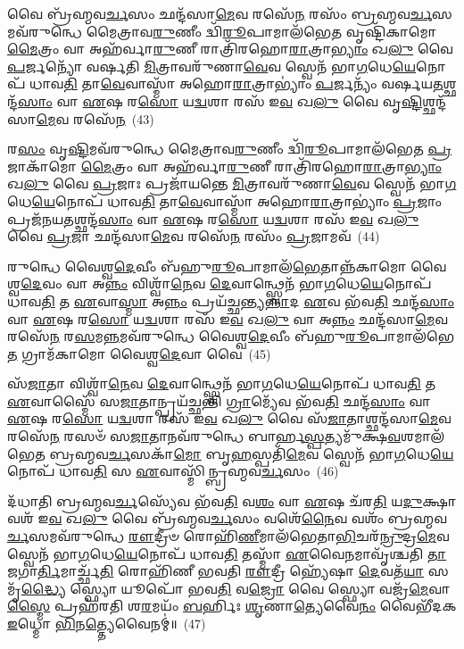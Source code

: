 𑌵𑍈 𑌬𑍍𑌰᳴𑌹𑍍𑌮𑌵\-\ul{𑌰𑍍𑌚}\-𑌸𑌂 𑌛𑌨𑍍𑌦᳴𑌸𑌾\-\ul{𑌮𑍇}\-𑌵 𑌰𑌸𑍇᳴\-\ul{𑌨} 𑌰𑌸𑌂᳴ 𑌬𑍍𑌰𑌹𑍍𑌮𑌵\-\ul{𑌰𑍍𑌚}\-𑌸𑌮𑌵᳴\-𑌰𑍁𑌨𑍍𑌧𑍇 𑌮𑍈𑌤𑍍𑌰𑌾𑌵\-\ul{𑌰𑍁}\-𑌣𑍀𑌂 𑌦𑍍𑌵𑌿᳴\-\ul{𑌰𑍂}\-𑌪𑌾𑌮𑌾\-𑌲᳴𑌭𑍇\-\ul{𑌤} 𑌵𑍃𑌷𑍍𑌟𑌿᳴𑌕𑌾𑌮𑍋 \ul{𑌮𑍈}\-𑌤𑍍𑌰𑌂 𑌵𑌾 𑌅𑌹᳴𑌰𑍍𑌵𑌾\-\ul{𑌰𑍁}\-𑌣𑍀 𑌰𑌾𑌤𑍍𑌰𑌿᳴𑌰𑌹𑍋\-\ul{𑌰𑌾}\-𑌤𑍍𑌰𑌾\-\ul{𑌭𑍍𑌯𑌾𑌂} 𑌖\-\ul{𑌲𑍁} 𑌵𑍈 \ul{𑌪}\-𑌰𑍍𑌜𑌨𑍍𑌯𑍋᳴ 𑌵𑌰𑍍\mbox{}𑌷𑌤𑌿 \ul{𑌮𑌿}\-𑌤𑍍𑌰𑌾𑌵𑌰𑍁᳴𑌣𑌾\-\ul{𑌵𑍇}\-𑌵 𑌸𑍍𑌵𑍇𑌨᳴ 𑌭𑌾\-\ul{𑌗}\-𑌧𑍇\-\ul{𑌯𑍇}\-𑌨𑍋𑌪᳴ 𑌧𑌾𑌵\-\ul{𑌤𑌿} 𑌤𑌾\-\ul{𑌵𑍇}\-𑌵𑌾𑌸𑍍𑌮𑌾᳴ 𑌅𑌹𑍋\-\ul{𑌰𑌾}\-𑌤𑍍𑌰𑌾\-𑌭𑍍𑌯𑌾𑌂॑ \ul{𑌪}\-𑌰𑍍𑌜𑌨𑍍𑌯𑌂᳴ 𑌵𑌰𑍍\mbox{}𑌷𑌯\-\ul{𑌤}\-𑌶𑍍𑌛𑌨𑍍𑌦᳴\-\ul{𑌸𑌾𑌂} 𑌵𑌾 \ul{𑌏}\-𑌷 𑌰\-\ul{𑌸𑍋} 𑌯\-\ul{𑌦𑍍𑌵}\-𑌶𑌾 𑌰𑌸᳴ 𑌇\-\ul{𑌵} 𑌖\-\ul{𑌲𑍁} 𑌵𑍈 𑌵𑍃\-\ul{𑌷𑍍𑌟𑌿}\-𑌶𑍍𑌛𑌨𑍍𑌦᳴𑌸𑌾\-\ul{𑌮𑍇}\-𑌵 𑌰𑌸𑍇᳴\-\ul{𑌨}\-~(43)

𑌰\-\ul{𑌸𑌂} 𑌵𑍃\-\ul{𑌷𑍍𑌟𑌿}\-𑌮𑌵᳴\-𑌰𑍁𑌨𑍍𑌧𑍇 𑌮𑍈𑌤𑍍𑌰𑌾𑌵\-\ul{𑌰𑍁}\-𑌣𑍀𑌂 𑌦𑍍𑌵𑌿᳴\-\ul{𑌰𑍂}\-𑌪𑌾𑌮𑌾𑌲᳴𑌭𑍇𑌤 \ul{𑌪𑍍𑌰}\-𑌜𑌾𑌕𑌾᳴𑌮𑍋 \ul{𑌮𑍈}\-𑌤𑍍𑌰𑌂 𑌵𑌾 𑌅𑌹᳴𑌰𑍍𑌵𑌾\-\ul{𑌰𑍁}\-𑌣𑍀 𑌰𑌾𑌤𑍍𑌰𑌿᳴𑌰𑌹𑍋\-\ul{𑌰𑌾}\-𑌤𑍍𑌰𑌾\-\ul{𑌭𑍍𑌯𑌾𑌂} 𑌖\-\ul{𑌲𑍁} 𑌵𑍈 \ul{𑌪𑍍𑌰}\-𑌜𑌾𑌃 𑌪𑍍𑌰𑌜𑌾᳴𑌯𑌨𑍍𑌤𑍇 \ul{𑌮𑌿}\-𑌤𑍍𑌰𑌾𑌵𑌰𑍁᳴𑌣𑌾\-\ul{𑌵𑍇}\-𑌵 𑌸𑍍𑌵𑍇𑌨᳴ 𑌭𑌾\-\ul{𑌗}\-𑌧𑍇\-\ul{𑌯𑍇}\-𑌨𑍋𑌪᳴ 𑌧𑌾𑌵\-\ul{𑌤𑌿} 𑌤𑌾\-\ul{𑌵𑍇}\-𑌵𑌾𑌸𑍍𑌮𑌾᳴ 𑌅𑌹𑍋\-\ul{𑌰𑌾}\-𑌤𑍍𑌰𑌾\-𑌭𑍍𑌯𑌾𑌂॑ \ul{𑌪𑍍𑌰}\-𑌜𑌾𑌂 𑌪𑍍𑌰𑌜᳴𑌨𑌯\-\ul{𑌤}\-𑌶𑍍𑌛𑌨𑍍𑌦᳴\-\ul{𑌸𑌾𑌂} 𑌵𑌾 \ul{𑌏}\-𑌷 𑌰\-\ul{𑌸𑍋} 𑌯\-\ul{𑌦𑍍𑌵}\-𑌶𑌾 𑌰𑌸᳴ 𑌇\-\ul{𑌵} 𑌖\-\ul{𑌲𑍁} 𑌵𑍈 \ul{𑌪𑍍𑌰}\-𑌜𑌾 𑌛𑌨𑍍𑌦᳴𑌸𑌾\-\ul{𑌮𑍇}\-𑌵 𑌰𑌸𑍇᳴\-\ul{𑌨} 𑌰𑌸𑌂᳴ \ul{𑌪𑍍𑌰}\-𑌜𑌾𑌮𑌵᳴~(44)

𑌰𑍁𑌨𑍍𑌧𑍇 𑌵𑍈𑌶𑍍𑌵\-\ul{𑌦𑍇}\-𑌵𑍀𑌂 𑌬᳴𑌹𑍁\-\ul{𑌰𑍂}\-𑌪𑌾𑌮𑌾𑌲᳴\-\ul{𑌭𑍇}\-𑌤𑌾𑌨𑍍𑌨᳴𑌕𑌾𑌮𑍋 𑌵𑍈𑌶𑍍𑌵\-\ul{𑌦𑍇}\-𑌵𑌂 𑌵𑌾 𑌅\-\ul{𑌨𑍍𑌨𑌂} 𑌵𑌿𑌶𑍍𑌵𑌾᳴\-\ul{𑌨𑍇}\-𑌵 \ul{𑌦𑍇}\-𑌵𑌾𑌨𑍍𑌥𑍍𑌸𑍍𑌵𑍇𑌨᳴ 𑌭𑌾\-\ul{𑌗}\-𑌧𑍇\-\ul{𑌯𑍇}\-𑌨𑍋𑌪᳴ 𑌧𑌾𑌵\-\ul{𑌤𑌿} 𑌤 \ul{𑌏}\-𑌵𑌾\-\ul{𑌸𑍍𑌮𑌾} 𑌅\-\ul{𑌨𑍍𑌨𑌂} 𑌪𑍍𑌰𑌯᳴𑌚𑍍𑌛𑌨𑍍𑌤𑍍𑌯\-\ul{𑌨𑍍𑌨𑌾}\-𑌦 \ul{𑌏}\-𑌵 𑌭᳴𑌵\-\ul{𑌤𑌿} 𑌛𑌨𑍍𑌦᳴\-\ul{𑌸𑌾𑌂} 𑌵𑌾 \ul{𑌏}\-𑌷 𑌰\-\ul{𑌸𑍋} 𑌯\-\ul{𑌦𑍍𑌵}\-𑌶𑌾 𑌰𑌸᳴ 𑌇\-\ul{𑌵} 𑌖\-\ul{𑌲𑍁} 𑌵𑌾 𑌅\-\ul{𑌨𑍍𑌨𑌂} 𑌛𑌨𑍍𑌦᳴𑌸𑌾\-\ul{𑌮𑍇}\-𑌵 𑌰𑌸𑍇᳴\-\ul{𑌨} 𑌰\-\ul{𑌸}\-𑌮\-\ul{𑌨𑍍𑌨}\-𑌮𑌵᳴\-𑌰𑍁𑌨𑍍𑌧𑍇 𑌵𑍈𑌶𑍍𑌵\-\ul{𑌦𑍇}\-𑌵𑍀𑌂 𑌬᳴𑌹𑍁\-\ul{𑌰𑍂}\-𑌪𑌾𑌮𑌾\-𑌲᳴𑌭𑍇\-\ul{𑌤} 𑌗𑍍𑌰𑌾𑌮᳴𑌕𑌾𑌮𑍋 𑌵𑍈𑌶𑍍𑌵\-\ul{𑌦𑍇}\-𑌵𑌾 𑌵𑍈~(45)

𑌸᳴\-\ul{𑌜𑌾}\-𑌤𑌾 𑌵𑌿𑌶𑍍𑌵𑌾᳴\-\ul{𑌨𑍇}\-𑌵 \ul{𑌦𑍇}\-𑌵𑌾𑌨𑍍𑌥𑍍𑌸𑍍𑌵𑍇𑌨᳴ 𑌭𑌾\-\ul{𑌗}\-𑌧𑍇\-\ul{𑌯𑍇}\-𑌨𑍋𑌪᳴ 𑌧𑌾𑌵\-\ul{𑌤𑌿} 𑌤 \ul{𑌏}\-𑌵𑌾𑌸𑍍𑌮𑍈᳴ 𑌸\-\ul{𑌜𑌾}\-𑌤𑌾𑌨𑍍𑌪𑍍𑌰𑌯᳴𑌚𑍍𑌛𑌨𑍍𑌤𑌿 \ul{𑌗𑍍𑌰𑌾}\-𑌮𑍍𑌯𑍇᳴𑌵 𑌭᳴𑌵\-\ul{𑌤𑌿} 𑌛𑌨𑍍𑌦᳴\-\ul{𑌸𑌾𑌂} 𑌵𑌾 \ul{𑌏}\-𑌷 𑌰\-\ul{𑌸𑍋} 𑌯\-\ul{𑌦𑍍𑌵}\-𑌶𑌾 𑌰𑌸᳴ 𑌇\-\ul{𑌵} 𑌖\-\ul{𑌲𑍁} 𑌵𑍈 𑌸᳴\-\ul{𑌜𑌾}\-𑌤𑌾𑌶𑍍𑌛𑌨𑍍𑌦᳴𑌸𑌾\-\ul{𑌮𑍇}\-𑌵 𑌰𑌸𑍇᳴\-\ul{𑌨} 𑌰𑌸𑍞᳴ 𑌸\-\ul{𑌜𑌾}\-𑌤𑌾𑌨𑌵᳴\-𑌰𑍁𑌨𑍍𑌧𑍇 𑌬𑌾𑌰𑍍\mbox{}𑌹\-\ul{𑌸𑍍𑌪}\-𑌤𑍍𑌯𑌮𑍁᳴𑌕𑍍𑌷\-\ul{𑌵}\-𑌶𑌮𑌾𑌲᳴𑌭𑍇𑌤 𑌬𑍍𑌰𑌹𑍍𑌮𑌵\-\ul{𑌰𑍍𑌚}\-𑌸𑌕𑌾᳴\-\ul{𑌮𑍋} 𑌬𑍃\-\ul{𑌹}\-𑌸𑍍𑌪𑌤𑌿᳴\-\ul{𑌮𑍇}\-𑌵 𑌸𑍍𑌵𑍇𑌨᳴ 𑌭𑌾\-\ul{𑌗}\-𑌧𑍇\-\ul{𑌯𑍇}\-𑌨𑍋𑌪᳴ 𑌧𑌾𑌵\-\ul{𑌤𑌿} 𑌸 \ul{𑌏}\-𑌵𑌾𑌸𑍍𑌮𑌿᳴𑌨𑍍𑌬𑍍𑌰𑌹𑍍𑌮𑌵\-\ul{𑌰𑍍𑌚}\-𑌸𑌂~(46)

𑌦᳴𑌧𑌾𑌤𑌿 𑌬𑍍𑌰𑌹𑍍𑌮𑌵\-\ul{𑌰𑍍𑌚}\-𑌸𑍍𑌯𑍇᳴𑌵 𑌭᳴𑌵\-\ul{𑌤𑌿} 𑌵\-\ul{𑌶𑌂} 𑌵𑌾 \ul{𑌏}\-𑌷 𑌚᳴𑌰\-\ul{𑌤𑌿} 𑌯\-\ul{𑌦𑍁}\-𑌕𑍍𑌷𑌾 𑌵𑌶᳴ 𑌇\-\ul{𑌵} 𑌖\-\ul{𑌲𑍁} 𑌵𑍈 𑌬𑍍𑌰᳴𑌹𑍍𑌮𑌵\-\ul{𑌰𑍍𑌚}\-𑌸𑌂 𑌵𑌶𑍇᳴\-\ul{𑌨𑍈}\-𑌵 𑌵𑌶𑌂᳴ 𑌬𑍍𑌰𑌹𑍍𑌮𑌵\-\ul{𑌰𑍍𑌚}\-𑌸𑌮𑌵᳴\-𑌰𑍁𑌨𑍍𑌧𑍇 \ul{𑌰𑍗}\-𑌦𑍍𑌰𑍀𑍞 𑌰𑍋𑌹𑌿᳴\-\ul{𑌣𑍀}\-𑌮𑌾𑌲᳴𑌭𑍇𑌤𑌾\-\ul{𑌭𑌿}\-𑌚𑌰᳴\-\ul{𑌨𑍍𑌰𑍁}\-𑌦𑍍𑌰\-\ul{𑌮𑍇}\-𑌵 𑌸𑍍𑌵𑍇𑌨᳴ 𑌭𑌾\-\ul{𑌗}\-𑌧𑍇\-\ul{𑌯𑍇}\-𑌨𑍋𑌪᳴ 𑌧𑌾𑌵\-\ul{𑌤𑌿} 𑌤𑌸𑍍𑌮𑌾᳴ \ul{𑌏}\-𑌵𑍈\-\ul{𑌨}\-𑌮𑌾𑌵𑍃᳴𑌶𑍍𑌚𑌤𑌿 \ul{𑌤𑌾}\-𑌜𑌗𑌾\-\ul{𑌰𑍍𑌤𑌿}\-𑌮𑌾𑌰𑍍𑌚𑍍𑌛᳴\-\ul{𑌤𑌿} 𑌰𑍋𑌹𑌿᳴𑌣𑍀 𑌭𑌵𑌤𑌿 \ul{𑌰𑍗}\-𑌦𑍍𑌰𑍀 𑌹𑍍𑌯𑍇᳴𑌷𑌾 \ul{𑌦𑍇}\-𑌵𑌤᳴\-\ul{𑌯𑌾} 𑌸𑌮𑍃᳴\-\ul{𑌦𑍍𑌧𑍍𑌯𑍈} 𑌸𑍍𑌫𑍍𑌯𑍋 𑌯𑍂𑌪𑍋᳴ 𑌭𑌵\-\ul{𑌤𑌿} 𑌵\-\ul{𑌜𑍍𑌰𑍋} 𑌵𑍈 𑌸𑍍𑌫𑍍𑌯𑍋 𑌵𑌜𑍍𑌰᳴\-\ul{𑌮𑍇}\-𑌵𑌾\-\ul{𑌸𑍍𑌮𑍈} 𑌪𑍍𑌰𑌹᳴𑌰𑌤𑌿 𑌶\-\ul{𑌰}\-𑌮𑌯𑌂᳴ \ul{𑌬}\-𑌰𑍍\mbox{}𑌹𑌿𑌃 \ul{𑌶𑍃}\-𑌣𑌾\-\ul{𑌤𑍍𑌯𑍇}\-𑌵𑍈\-\ul{𑌨𑌂} 𑌵𑍈𑌭𑍀᳴𑌦𑌕 \ul{𑌇}\-𑌧𑍍𑌮𑍋 \ul{𑌭𑌿}\-𑌨\-\ul{𑌤𑍍𑌤𑍍𑌯𑍇}\-𑌵𑍈𑌨𑌮𑍍॑॥~(47)

